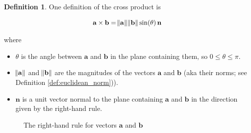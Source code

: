 \documentclass{article}
\theoremstyle{definition}
\newtheorem{definition}{Definition}[section]
\begin{document}
\begin{definition}
\bigskip
\noindent
One definition of the cross product is 

\bigskip
\begin{equation}
\mathbf{a} \times \mathbf{b} = \norm{\mathbf{a}}
\norm{\mathbf{b}} \sin (\theta) \, \mathbf{n}
\label{eqn:cross_product}
\end{equation}

\bigskip
\noindent
where

\bigskip
\begin{itemize}
\item $\theta$ is the angle between $\mathbf{a}$ and $\mathbf{b}$
in the plane containing them, so $0 \leq \theta \leq \pi$.

\item $\norm{\mathbf{a}}$ and $\norm{\mathbf{b}}$ are the magnitudes 
of the vectors $\mathbf{a}$ and $\mathbf{b}$ (aka their norms; see 
Definition \ref{def:euclidean_norm})). 

\item $\mathbf{n}$ is a unit vector normal to the plane
containing $\mathbf{a}$ and $\mathbf{b}$ in the direction given
by the right-hand rule.
\end{itemize}

\bigskip
\begin{figure}[H]
\caption{The right-hand rule for vectors $\mathbf{a}$ and 
         $\mathbf{b}$ \cite{wiki:right_hand_rule_for_cross_products}}
\label{fig:right_hand_rule_for_cross_products}
\end{figure}



\end{definition}
\end{document}
